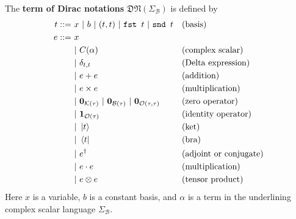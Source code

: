 \documentclass[manuscript, review, timestamp]{acmart}
\newcommand*{\fst}{\texttt{fst }}
\newcommand*{\snd}{\texttt{snd }}
\begin{document}
\begin{definition}
  The \textbf{term of Dirac notations} $\mathfrak{DN}(\Sigma_\mathcal{B})$ is defined by
  \begin{align*}
    t ::= \ & x\ |\ b\ |\ (t, t)\ |\ \fst t\ |\ \snd t  && \text{(basis)} \\
    e ::= \ 
      &    x                          \\
      & |\ C(\alpha)                     && \text{(complex scalar)}   \\
      & |\ \delta_{t, t}              && \text{(Delta expression)} \\
      & |\ e + e                      && \text{(addition)} \\
      & |\ e \times e                 && \text{(multiplication)} \\
      & |\ \mathbf{0}_{\mathcal{K}(\tau)}\ |\ \mathbf{0}_{\mathcal{B}(\tau)}\ |\ \mathbf{0}_{\mathcal{O}(\tau, \tau)}    && \text{(zero operator)}\\
      & |\ \mathbf{1}_{\mathcal{O}(\tau)} && \text{(identity operator)}\\
      & |\ \ket{t}                    && \text{(ket)} \\
      & |\ \bra{t}                    && \text{(bra)} \\
      & |\ e^\dagger                        && \text{(adjoint or conjugate)} \\
      & |\ e \cdot e                  && \text{(multiplication)} \\
      & |\ e \otimes e                && \text{(tensor product)}
  \end{align*}
  Here $x$ is a variable, $b$ is a constant basis, and $\alpha$ is a term in the underlining complex scalar language $\Sigma_\mathcal{B}$.
\end{definition}






\end{document}
